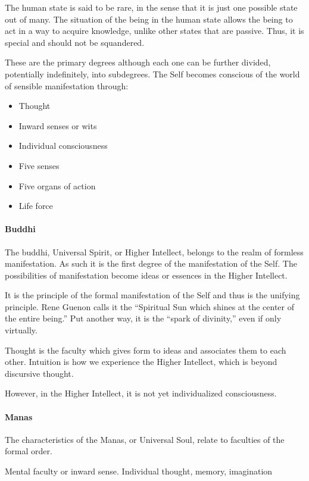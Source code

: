 The human state is said to be rare, in the sense that it is just one possible state out of many. The situation of the being in the human state allows the being to act in a way to acquire knowledge, unlike other states that are passive. Thus, it is special and should not be squandered.

These are the primary degrees although each one can be further divided, potentially indefinitely, into subdegrees. The Self becomes conscious of the world of sensible manifestation through:

\begin{itemize}
\item Thought 
\item Inward senses or wits 
\item Individual consciousness 
\item Five senses 
\item Five organs of action 
\item Life force 
\end{itemize}

\paragraph{Buddhi}
The buddhi, Universal Spirit, or Higher Intellect, belongs to the realm of formless manifestation. As such it is the first degree of the manifestation of the Self. The possibilities of manifestation become ideas or essences in the Higher Intellect.

It is the principle of the formal manifestation of the Self and thus is the unifying principle. Rene Guenon calls it the “Spiritual Sun which shines at the center of the entire being.” Put another way, it is the “spark of divinity,” even if only virtually.

Thought is the faculty which gives form to ideas and associates them to each other. Intuition is how we experience the Higher Intellect, which is beyond discursive thought.

However, in the Higher Intellect, it is not yet individualized consciousness.

\paragraph{Manas}
The characteristics of the Manas, or Universal Soul, relate to faculties of the formal order.

Mental faculty or inward sense. Individual thought, memory, imagination

